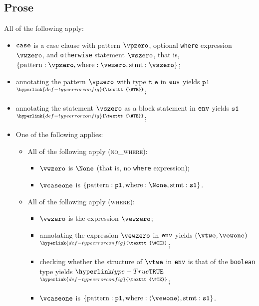 \documentclass{book}
\newcommand\TypeErrorConfig[0]{\hyperlink{def-typeerrorconfig}{\texttt{\#TE}}}
\newcommand\ProseOrTypeError[0]{\hyperlink{def-proseortypeerror}{$^{\TypeErrorConfig}$}}
\newcommand\vte[0]{\texttt{t\_e}}
\newcommand\vsone[0]{\texttt{s1}}
\newcommand\vpone[0]{\texttt{p1}}
\begin{document}
\subsection{Prose}
All of the following apply:
\begin{itemize}
  \item $\texttt{case}$ is a case clause with pattern $\vpzero$, optional \texttt{where} expression $\vwzero$,
        and \texttt{otherwise} statement $\vszero$, that is,
        $\{ \text{pattern} : \vpzero, \text{where} : \vwzero, \text{stmt} : \vszero \}$;
  \item annotating the pattern $\vpzero$ with type $\vte$ in $\texttt{env}$ yields $\vpone$ \ProseOrTypeError;
  \item annotating the statement $\vszero$ as a block statement in $\texttt{env}$ yields $\vsone$ \ProseOrTypeError;
  \item One of the following applies:
  \begin{itemize}
    \item All of the following apply (\textsc{no\_where}):
    \begin{itemize}
      \item $\vwzero$ is $\None$ (that is, no \texttt{where} expression);
      \item $\vcaseone$ is $\{ \text{pattern} : \vpone, \text{where} : \None, \text{stmt} : \vsone \}$.
    \end{itemize}

    \item All of the following apply (\textsc{where}):
    \begin{itemize}
      \item $\vwzero$ is the expression $\vewzero$;
      \item annotating the expression $\vewzero$ in $\texttt{env}$ yields $(\vtwe, \vewone)$ \ProseOrTypeError;
      \item checking whether the structure of $\vtwe$ in $\texttt{env}$ is that of the \texttt{boolean} type yields $\True$ \ProseOrTypeError;
      \item $\vcaseone$ is $\{ \text{pattern} : \vpone, \text{where} : \langle\vewone\rangle, \text{stmt} : \vsone \}$.
    \end{itemize}
  \end{itemize}
\end{itemize}
\end{document}
